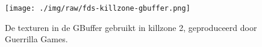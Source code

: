 \begin{figure}
  \centering
  \texttt{[image: ./img/raw/fds-killzone-gbuffer.png]}
  \caption{De texturen in de GBuffer gebruikt in killzone 2, geproduceerd door Guerrilla Games\cite{valient2009rendering}.}
  \label{fig:fds-gbuffer}
\end{figure}
